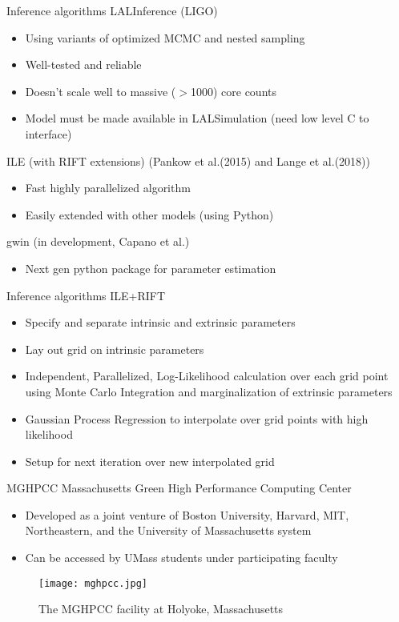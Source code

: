 \documentclass[uncompress,aspectratio=43]{beamer}  %
\begin{document}
\begin{frame}{Inference algorithms}
  LALInference (LIGO)
  \begin{itemize}
  \item Using variants of optimized MCMC and nested sampling
  \item Well-tested and reliable
   \item Doesn't scale well to massive ($>$1000) core counts
  \item Model must be made available in LALSimulation (need low level C to interface)
  \end{itemize}
  \medskip
  \pause
ILE (with RIFT extensions) (Pankow et al.(2015) and Lange et al.(2018))
\begin{itemize}
\item Fast highly parallelized algorithm  
\item Easily extended with other models (using Python)
\end{itemize}
\medskip
\pause
  gwin (in development, Capano et al.) 
  \begin{itemize}
  \item Next gen python package for parameter estimation
  \end{itemize}

\end{frame}

\begin{frame}{Inference algorithms}
  ILE+RIFT
  \begin{itemize}
  \item Specify and separate intrinsic and extrinsic parameters
  \item Lay out grid on intrinsic parameters
     \item Independent, Parallelized, Log-Likelihood calculation over each grid
       point using Monte Carlo Integration and marginalization of extrinsic parameters
     \item Gaussian Process Regression to interpolate over grid points with high
       likelihood
      \item Setup for next iteration over new interpolated grid
      \end{itemize}
\end{frame}

\begin{frame}{MGHPCC}
  Massachusetts Green High Performance Computing Center
  \begin{itemize}
    \item Developed as a joint venture of Boston University, Harvard, MIT,
      Northeastern, and the University of Massachusetts system
    \item Can be accessed by UMass students under participating faculty
    \end{itemize}
    \begin{figure}
    \begin{center}
      \texttt{[image: mghpcc.jpg]}
      \caption{The MGHPCC facility at Holyoke, Massachusetts}
    \end{center}
  \end{figure}
\end{frame}
\end{document}
